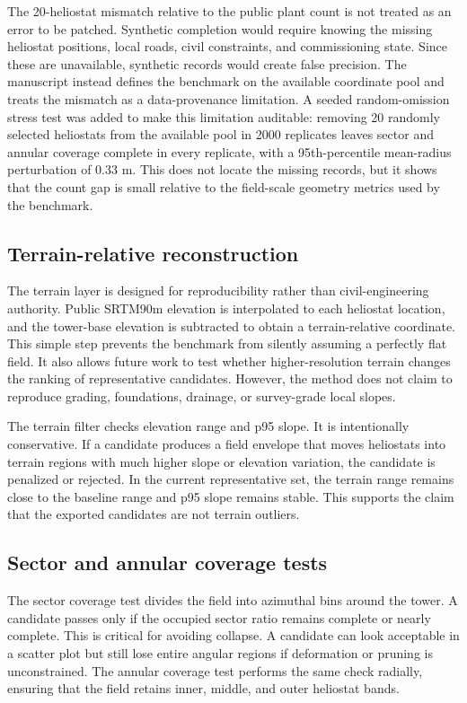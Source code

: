 \documentclass[final,3p,times]{elsarticle}
\begin{document}
The 20-heliostat mismatch relative to the public plant count is not treated as an error to be patched. Synthetic completion would require knowing the missing heliostat positions, local roads, civil constraints, and commissioning state. Since these are unavailable, synthetic records would create false precision. The manuscript instead defines the benchmark on the available coordinate pool and treats the mismatch as a data-provenance limitation. A seeded random-omission stress test was added to make this limitation auditable: removing 20 randomly selected heliostats from the available pool in 2000 replicates leaves sector and annular coverage complete in every replicate, with a 95th-percentile mean-radius perturbation of 0.33 m. This does not locate the missing records, but it shows that the count gap is small relative to the field-scale geometry metrics used by the benchmark.

\subsection{Terrain-relative reconstruction}
The terrain layer is designed for reproducibility rather than civil-engineering authority. Public SRTM90m elevation is interpolated to each heliostat location, and the tower-base elevation is subtracted to obtain a terrain-relative coordinate. This simple step prevents the benchmark from silently assuming a perfectly flat field. It also allows future work to test whether higher-resolution terrain changes the ranking of representative candidates. However, the method does not claim to reproduce grading, foundations, drainage, or survey-grade local slopes.

The terrain filter checks elevation range and p95 slope. It is intentionally conservative. If a candidate produces a field envelope that moves heliostats into terrain regions with much higher slope or elevation variation, the candidate is penalized or rejected. In the current representative set, the terrain range remains close to the baseline range and p95 slope remains stable. This supports the claim that the exported candidates are not terrain outliers.

\subsection{Sector and annular coverage tests}
The sector coverage test divides the field into azimuthal bins around the tower. A candidate passes only if the occupied sector ratio remains complete or nearly complete. This is critical for avoiding collapse. A candidate can look acceptable in a scatter plot but still lose entire angular regions if deformation or pruning is unconstrained. The annular coverage test performs the same check radially, ensuring that the field retains inner, middle, and outer heliostat bands.
\end{document}
